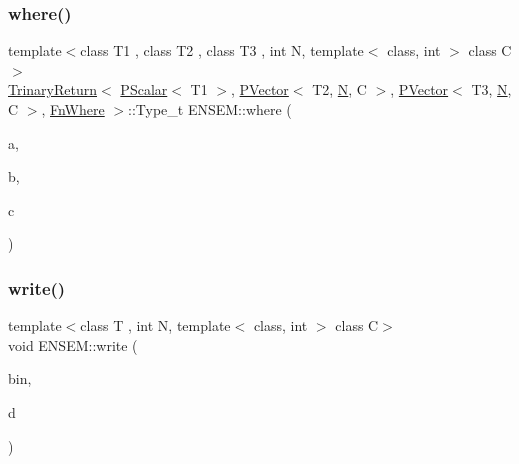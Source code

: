 \subsubsection{\texorpdfstring{where()}{where()}}
{\footnotesize\ttfamily template$<$class T1 , class T2 , class T3 , int N, template$<$ class, int $>$ class C$>$ \\
\mbox{\hyperlink{structENSEM_1_1TrinaryReturn}{Trinary\+Return}}$<$ \mbox{\hyperlink{classENSEM_1_1PScalar}{P\+Scalar}}$<$ T1 $>$, \mbox{\hyperlink{classENSEM_1_1PVector}{P\+Vector}}$<$ T2, \mbox{\hyperlink{operator__name__util_8cc_a7722c8ecbb62d99aee7ce68b1752f337}{N}}, C $>$, \mbox{\hyperlink{classENSEM_1_1PVector}{P\+Vector}}$<$ T3, \mbox{\hyperlink{operator__name__util_8cc_a7722c8ecbb62d99aee7ce68b1752f337}{N}}, C $>$, \mbox{\hyperlink{structENSEM_1_1FnWhere}{Fn\+Where}} $>$\+::Type\+\_\+t E\+N\+S\+E\+M\+::where (\begin{DoxyParamCaption}\item[{const \mbox{\hyperlink{classENSEM_1_1PScalar}{P\+Scalar}}$<$ T1 $>$ \&}]{a,  }\item[{const \mbox{\hyperlink{classENSEM_1_1PVector}{P\+Vector}}$<$ T2, \mbox{\hyperlink{operator__name__util_8cc_a7722c8ecbb62d99aee7ce68b1752f337}{N}}, C $>$ \&}]{b,  }\item[{const \mbox{\hyperlink{classENSEM_1_1PVector}{P\+Vector}}$<$ T3, \mbox{\hyperlink{operator__name__util_8cc_a7722c8ecbb62d99aee7ce68b1752f337}{N}}, C $>$ \&}]{c }\end{DoxyParamCaption})\hspace{0.3cm}{\ttfamily [inline]}}

\mbox{\label{group__primvector_ga06b3a608b1c1724f947b9a83bb506880}} 
\subsubsection{\texorpdfstring{write()}{write()}}
{\footnotesize\ttfamily template$<$class T , int N, template$<$ class, int $>$ class C$>$ \\
void E\+N\+S\+E\+M\+::write (\begin{DoxyParamCaption}\item[{\mbox{\hyperlink{classADATIO_1_1BinaryWriter}{A\+D\+A\+T\+I\+O\+::\+Binary\+Writer}} \&}]{bin,  }\item[{const \mbox{\hyperlink{classENSEM_1_1PVector}{P\+Vector}}$<$ T, \mbox{\hyperlink{operator__name__util_8cc_a7722c8ecbb62d99aee7ce68b1752f337}{N}}, C $>$ \&}]{d }\end{DoxyParamCaption})\hspace{0.3cm}{\ttfamily [inline]}}



